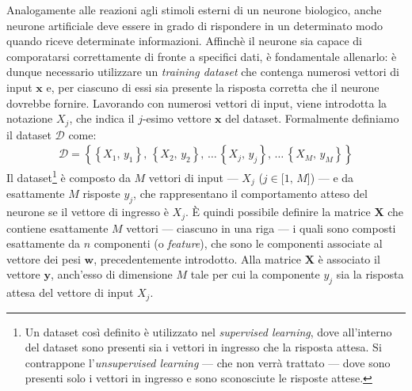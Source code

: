 Analogamente alle reazioni agli stimoli esterni di un neurone biologico, anche neurone artificiale deve essere in grado di rispondere in un determinato modo quando riceve determinate informazioni. Affinchè il neurone sia capace di comporatarsi correttamente di fronte a specifici dati, è fondamentale allenarlo: è dunque necessario utilizzare un \textit{training dataset} che contenga numerosi vettori di input $\mathbf{x}$ e, per ciascuno di essi sia presente la risposta corretta che il neurone dovrebbe fornire. Lavorando con numerosi vettori di input, viene introdotta la notazione $X_j$, che indica il $j$-esimo vettore $\mathbf{x}$ del dataset. Formalmente definiamo il dataset $\mathcal{D}$ come:
% 
\begin{gather*}
    \mathcal{D} = \left\{ \left\{ X_1,\, y_1 \right\},\,\left\{ X_2,\, y_2 \right\},\,\dots\,\left\{ X_j,\, y_j \right\},\,\dots\,\left\{ X_M,\, y_M \right\} \right\}  
\end{gather*}
% 
\noindent Il dataset\footnote{Un dataset così definito è utilizzato nel \textit{supervised learning}, dove all'interno del dataset sono presenti sia i vettori in ingresso che la risposta attesa. Si contrappone l'\textit{unsupervised learning} — che non verrà trattato — dove sono presenti solo i vettori in ingresso e sono sconosciute le risposte attese.} è composto da $M$ vettori di input — $X_j$ ($j\in[1,\,M$]) — e da esattamente $M$ risposte $y_j$, che rappresentano il comportamento atteso del neurone se il vettore di ingresso è $X_j$. È quindi possibile definire la matrice $\mathbf{X}$ che contiene esattamente $M$ vettori — ciascuno in una riga — i quali sono composti esattamente da $n$ componenti (o \textit{feature}), che sono le componenti associate al vettore dei pesi $\mathbf{w}$, precedentemente introdotto. Alla matrice $\mathbf{X}$ è associato il vettore $\mathbf{y}$, anch'esso di dimensione $M$ tale per cui la componente $y_j$ sia la risposta attesa del vettore di input $X_j$.
% 
